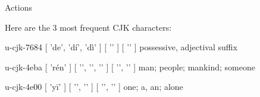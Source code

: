 




\vspace{\myLineheight}\begin{multicols}{2}\raggedcolumns{}

\end{multicols}


{\mktsHTwo{}Actions\mktsHTwoBeg}%


\vspace{\myLineheight}\begin{multicols}{2}\raggedcolumns{}Here are the 3 most frequent CJK characters:



\lettrine[lines=3]{\cjkgGlue{}}{}\begin{minipage}{0.8\linewidth} u-cjk-7684  [ 'de', 'dí', 'dì' ]  [ '\cjkgGlue{}' ]  [ '\cjkgGlue{}' ]  possessive, adjectival suffix \end{minipage}

\lettrine[lines=3]{\cjkgGlue{}}{}\begin{minipage}{0.8\linewidth} u-cjk-4eba  [ 'rén' ]  [ '\cjkgGlue{}', '\cjkgGlue{}', '\cjkgGlue{}' ]  [ '\cjkgGlue{}', '\cjkgGlue{}' ]  man; people; mankind; someone \end{minipage}

\lettrine[lines=3]{\cjkgGlue{}}{}\begin{minipage}{0.8\linewidth} u-cjk-4e00  [ 'yī' ]  [ '\cjkgGlue{}', '\cjkgGlue{}' ]  [ '\cjkgGlue{}', '\cjkgGlue{}' ]  one; a, an; alone \end{minipage}



\end{multicols}



